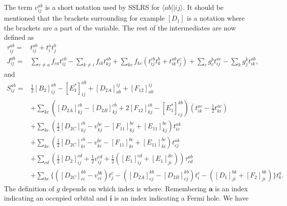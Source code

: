 \documentclass[a4paper,norsk,11pt,twoside]{report}
\begin{document}
The term $v_{ij}^{ab}$ is a short notation used by SSLRS for $\langle
ab || ij \rangle$. It should be mentioned that the brackets
surrounding for example $[D_1]$ is a notation where the brackets are a
part of the variable. The rest of the intermediates are now defined as
\begin{align}
\tau_{ij}^{ab} = & t_{ij}^{ab} + t_i^a t_j^b
\\ 
J_{ij}^{ab} = &
\sum_{c \not= a} f_{ca} t_{ij}^{cb}
- \sum_{k \not= i} f_{ik} t_{kj}^{ab}
+ \sum_{kc} f_{kc} (t_{ij}^{cb} t_k^b + t_{ik}^{ab} t_j^c )
+ \sum_c g_c^b t_{ij}^{ac} - \sum_k g_j^k t_{ik}^{ab},
\end{align}
and
\begin{align}
S_{ij}^{ab} = & 
\frac{1}{2} [B_2]_{ij}^{ab}
- [E_1^*]_{ij}^{ab}
+ [D_{2A}]_{ab}^{ij}
+ [F_{12}]_{ab}^{ij} 
 \\ &
+ \sum_{kc} (
[D_{2A}]_{kj}^{cb} - [D_{2B}]_{kj}^{cb}
+ 2[F_{12}]_{kj}^{cb}
- [E_1^*]_{cj}^{kb} )
( t_{ik}^{ac} - \frac{1}{2} t_{ki}^{ac} )
\nonumber \\ &
+ \sum_{kc} (\frac{1}{2} [D_{2C}]_{kj}^{cb}
- v_{kj}^{bc} - [F_{11}]_{kj}^{bc} + [E_{11}]_{kj}^{bc}) t_{ic}^{ak}
\nonumber \\ &
+ \sum_{kc} (\frac{1}{2} [D_{2C}]_{ki}^{cb} - v_{ki}^{bc} - [F_{11}]_{ki}^{bc} 
+ [E_{11}]_{ki}^{bc} ) t_{cj}^{ak}
\nonumber \\ &
+ \sum_{cd} ( \frac{1}{2} [D_2]_{ij}^{cd} 
+ \frac{1}{2} v_{ij}^{cd} + \frac{1}{2} (
[E_1]_{ij}^{cd} + [E_1]_{ji}^{dc}))
\tau_{cd}^{ab}
\nonumber \\ &
+ \sum_{kc} \{
([D_{2C}]_{ci}^{kb} - v_{ci}^{bk}) t_j^c
- ([D_{2A}]_{cj}^{kb} 
- [D_{2B}]_{cj}^{kb} ) t_i^c
- ([D_1]_{ji}^{bk} + [F_2]_{ji}^{bk}) \} t_k^a .
\nonumber
\end{align}
The definition of $g$ depends on which index is where. Remembering
$\textbf{a}$ is an index indicating an occupied orbital and
$\textbf{i}$ is an index indicating a Fermi hole. We have
\end{document}
